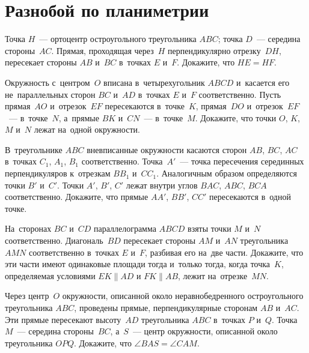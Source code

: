 
\section*{Разнобой по планиметрии}


\begin{problems}

\item
Точка $H$~— ортоцентр остроугольного треугольника $ABC$;
точка $D$~— середина стороны~$AC$.
Прямая, проходящая через~$H$ перпендикулярно отрезку~$DH$, пересекает стороны
$AB$ и~$BC$ в~точках $E$ и~$F$.
Докажите, что $HE = HF$.

\item
Окружность с~центром~$O$ вписана в~четырехугольник $ABCD$ и~касается его
не~параллельных сторон $BC$ и~$AD$ в~точках $E$ и~$F$ соответственно.
Пусть прямая~$AO$ и~отрезок~$EF$ пересекаются в~точке~$K$, прямая~$DO$
и~отрезок~$EF$~— в~точке~$N$, а~прямые $BK$ и~$CN$~— в~точке~$M$.
Докажите, что точки $O$, $K$, $M$ и~$N$ лежат на~одной окружности.

\item
В~треугольнике $ABC$ вневписанные окружности касаются сторон $AB$, $BC$, $AC$
в~точках $C_1$, $A_1$, $B_1$ соответственно.
Точка~$A'$~— точка пересечения серединных перпендикуляров к~отрезкам
$B B_1$ и~$C C_1$.
Аналогичным образом определяются точки $B'$ и~$C'$.
Точки $A'$, $B'$, $C'$ лежат внутри углов $BAC$, $ABC$, $BCA$ соответственно.
Докажите, что прямые $AA'$, $BB'$, $CC'$ пересекаются в~одной точке.

\item
На~сторонах $BC$ и~$CD$ параллелограмма $ABCD$ взяты точки $M$ и~$N$
соответственно.
Диагональ~$BD$ пересекает стороны $AM$ и~$AN$ треугольника $AMN$ соответственно
в~точках $E$ и~$F$, разбивая его на~две части.
Докажите, что эти части имеют одинаковые площади тогда и~только тогда, когда
точка~$K$, определяемая условиями $EK \parallel AD$ и $FK \parallel AB$, лежит
на~отрезке~$MN$.

\item
Через центр~$O$ окружности, описанной около неравнобедренного остроугольного
треугольника $ABC$, проведены прямые, перпендикулярные сторонам $AB$ и~$AC$.
Эти прямые пересекают высоту~$AD$ треугольника $ABC$ в~точках $P$ и~$Q$.
Точка~$M$~— середина стороны~$BC$, а~$S$~— центр окружности, описанной
около треугольника $OPQ$.
Докажите, что $\angle BAS = \angle CAM$.


\end{problems}
